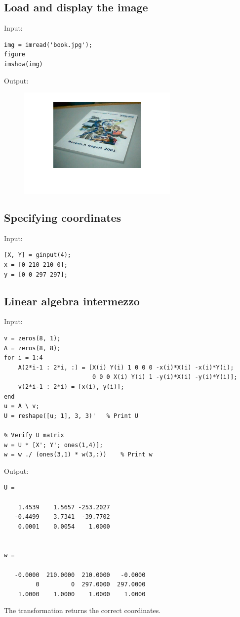 \documentclass[12pt, a4paper]{article}
\begin{document}
\subsection{Load and display the image}
Input:
\begin{verbatim}
img = imread('book.jpg');
figure
imshow(img)
\end{verbatim}
Output:
\begin{figure}[H]
    \centering
    \includegraphics[width=0.7\textwidth]{fig32.png}
\end{figure}

\subsection{Specifying coordinates}
Input:
\begin{verbatim}
[X, Y] = ginput(4);
x = [0 210 210 0];
y = [0 0 297 297];
\end{verbatim}
\newpage
\subsection{Linear algebra intermezzo}
Input:
\begin{verbatim}
v = zeros(8, 1);
A = zeros(8, 8);
for i = 1:4
    A(2*i-1 : 2*i, :) = [X(i) Y(i) 1 0 0 0 -x(i)*X(i) -x(i)*Y(i);
                         0 0 0 X(i) Y(i) 1 -y(i)*X(i) -y(i)*Y(i)];
    v(2*i-1 : 2*i) = [x(i), y(i)];
end
u = A \ v;
U = reshape([u; 1], 3, 3)'   % Print U

% Verify U matrix
w = U * [X'; Y'; ones(1,4)];
w = w ./ (ones(3,1) * w(3,:))    % Print w
\end{verbatim}
Output:
\begin{verbatim}
U =

    1.4539    1.5657 -253.2027
   -0.4499    3.7341  -39.7702
    0.0001    0.0054    1.0000


w =

   -0.0000  210.0000  210.0000   -0.0000
         0         0  297.0000  297.0000
    1.0000    1.0000    1.0000    1.0000
\end{verbatim}
The transformation returns the correct coordinates.
\end{document}

